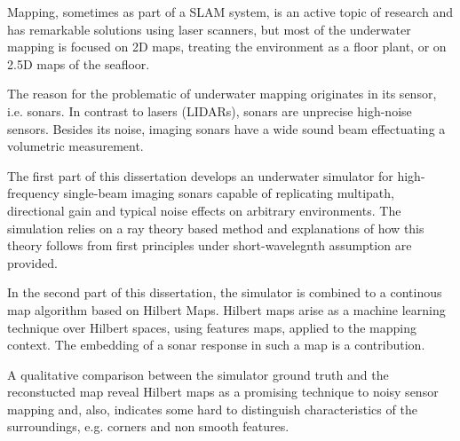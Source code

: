 Mapping, sometimes as part of a SLAM system, is an active topic of research and has remarkable solutions using laser scanners, but most of the underwater mapping is focused on 2D maps, treating the environment as a floor
plant, or on 2.5D maps of the seafloor.

The reason for the problematic of underwater mapping originates in its sensor,
i.e. sonars. In contrast to lasers (LIDARs),
sonars are unprecise high-noise sensors. Besides its noise,
imaging sonars have a wide sound beam effectuating a volumetric measurement.

The first part of this dissertation develops an underwater simulator for
high-frequency single-beam imaging sonars capable of replicating multipath, directional
gain and typical noise effects on arbitrary environments. The simulation relies
on a ray theory based method and explanations of how this theory follows from
first principles under short-wavelegnth assumption are provided.

In the second part of this dissertation, the simulator is combined to a
continous map algorithm based on Hilbert Maps.
Hilbert maps arise as a machine learning technique over Hilbert spaces, using
features maps, applied to the mapping context. The embedding of a sonar response in
such a map is a contribution.

A qualitative comparison between the simulator ground truth and the reconstucted
map reveal Hilbert maps as a promising technique to noisy sensor mapping and,
also, indicates some hard to distinguish characteristics of the surroundings,
e.g. corners and non smooth features.

